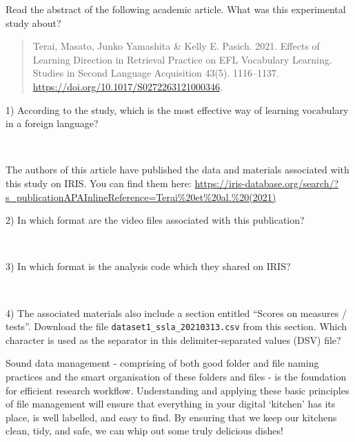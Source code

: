\documentclass[
  letterpaper,
  DIV=11,
  numbers=noendperiod]{scrreprt}
\begin{document}
\begin{tcolorbox}[enhanced jigsaw, colframe=quarto-callout-caution-color-frame, titlerule=0mm, toptitle=1mm, leftrule=.75mm, colbacktitle=quarto-callout-caution-color!10!white, title=\textcolor{quarto-callout-caution-color}{\faFire}\hspace{0.5em}{Task}, bottomtitle=1mm, coltitle=black, breakable, opacitybacktitle=0.6, colback=white, left=2mm, arc=.35mm, opacityback=0, toprule=.15mm, rightrule=.15mm, bottomrule=.15mm]

Read the abstract of the following academic article. What was this
experimental study about?

\begin{quote}
Terai, Masato, Junko Yamashita \& Kelly E. Pasich. 2021. Effects of
Learning Direction in Retrieval Practice on EFL Vocabulary Learning.
Studies in Second Language Acquisition 43(5). 1116--1137.
\href{https://doi.org/10.1017/S0272263121000346https://doi.org/10.1017/S0272263121000346}{https://doi.org/10.1017/S0272263121000346}.
\end{quote}

1) According to the study, which is the most effective way of learning
vocabulary in a foreign language?

~

The authors of this article have published the data and materials
associated with this study on IRIS. You can find them here:
\url{https://iris-database.org/search/?s_publicationAPAInlineReference=Terai\%20et\%20al.\%20(2021)}

2) In which format are the video files associated with this publication?

~

3) In which format is the analysis code which they shared on IRIS?

~

4) The associated materials also include a section entitled ``Scores on
measures / tests''. Download the file
\texttt{dataset1\_ssla\_20210313.csv} from this section. Which character
is used as the separator in this delimiter-separated values (DSV) file?

\end{tcolorbox}

Sound data management - comprising of both good folder and file naming
practices and the smart organisation of these folders and files - is the
foundation for efficient research workflow. Understanding and applying
these basic principles of file management will ensure that everything in
your digital `kitchen' has its place, is well labelled, and easy to
find. By ensuring that we keep our kitchens clean, tidy, and safe, we
can whip out some truly delicious dishes!
\end{document}
